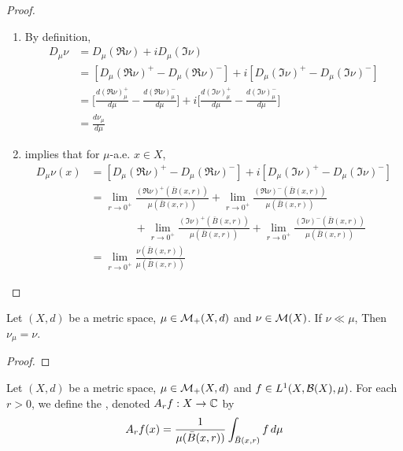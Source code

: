 \documentclass{book}
\begin{document}
	\begin{proof}\
		\begin{enumerate}
			\item By definition, 
			\begin{align*}
				D_{\mu} \nu
				& = D_{\mu} (\Re \nu) + i D_{\mu} (\Im \nu) \\
				& = [D_{\mu} (\Re \nu)^+ - D_{\mu} (\Re \nu)^-] + i [D_{\mu} (\Im \nu)^+ - D_{\mu} (\Im \nu)^-] \\
				& = \bigg[ \frac{ d(\Re \nu)^+_{\mu}}{d\mu} - \frac{d (\Re \nu)^-_{\mu}}{d \mu} \bigg] + i \bigg[ \frac{d (\Im \nu)^+_{\mu}}{d \mu} - \frac{d (\Im \nu)^-_{\mu}}{d \mu} \bigg] \\
				& = \frac{d \nu_{\mu}}{d \mu}
			\end{align*}
			\item {} implies that for $\mu$-a.e. $x \in X$, 
			\begin{align*}
				D_{\mu} \nu(x)
				& = [D_{\mu} (\Re \nu)^+ - D_{\mu} (\Re \nu)^-] + i [D_{\mu} (\Im \nu)^+ - D_{\mu} (\Im \nu)^-] \\
				& = \lim_{r \rightarrow 0^+} \frac{ (\Re \nu)^+(\bar{B}(x, r))}{\mu(\bar{B}(x, r))} + \lim_{r \rightarrow 0^+} \frac{ (\Re \nu)^-(\bar{B}(x, r))}{\mu(\bar{B}(x, r))} \\
				& \quad \quad \quad \quad  + \lim_{r \rightarrow 0^+} \frac{ (\Im \nu)^+(\bar{B}(x, r))}{\mu(\bar{B}(x, r))} + \lim_{r \rightarrow 0^+} \frac{ (\Im \nu)^- (\bar{B}(x, r))}{\mu(\bar{B}(x, r))} \\
				& = \lim_{r \rightarrow 0^+} \frac{\nu(\bar{B}(x, r))}{\mu(\bar{B}(x, r))}
			\end{align*}
		\end{enumerate}
	\end{proof}

	\begin{ex} 
		Let $(X, d)$ be a metric space, $\mu \in \mathcal{M}_+(X, d)$ and $\nu \in \mathcal{M}(X)$. If $\nu \ll \mu$, Then $\nu_{\mu} = \nu$.
	\end{ex}

	\begin{proof}
	\end{proof}
	
	\begin{defn} 
		Let $(X, d)$ be a metric space, $\mu \in \mathcal{M}_+(X, d)$ and $f \in L^1(X, \mathcal{B}(X), \mu)$. For each $r > 0$, we define the , denoted $A_rf: X \rightarrow \mathbb{C}$ by 
		$$A_rf(x) = \frac{1}{\mu(\bar{B}(x, r))} \int_{\bar{B}(x, r)} f \, d \mu$$
	\end{defn}
\end{document}
